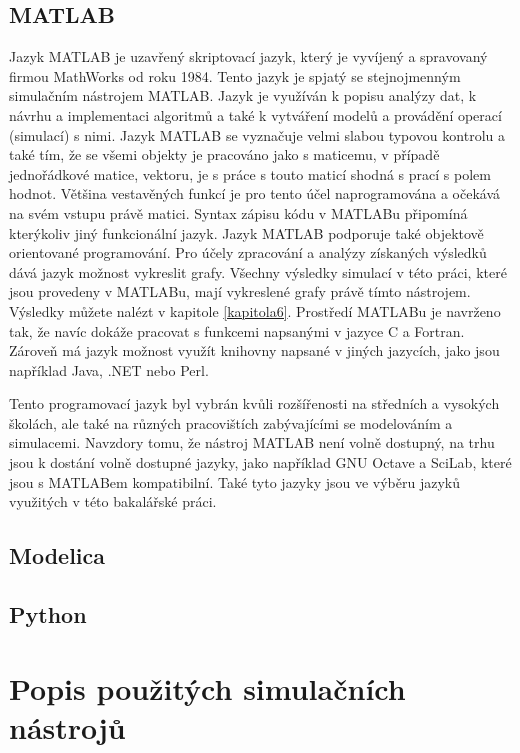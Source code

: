 \subsection{MATLAB}
Jazyk MATLAB je uzavřený skriptovací jazyk, který je vyvíjený a spravovaný firmou MathWorks od roku 1984. Tento jazyk je spjatý se stejnojmenným simulačním nástrojem MATLAB. Jazyk je využíván k popisu analýzy dat, k návrhu a implementaci algoritmů a také k vytváření modelů a provádění operací (simulací) s nimi. Jazyk MATLAB se vyznačuje velmi slabou typovou kontrolu a také tím, že se všemi objekty je pracováno jako s maticemu, v případě jednořádkové matice, vektoru, je s práce s touto maticí shodná s prací s polem hodnot. Většina vestavěných funkcí je pro tento účel naprogramována a očekává na svém vstupu právě matici. Syntax zápisu kódu v MATLABu připomíná kterýkoliv jiný funkcionální jazyk. Jazyk MATLAB podporuje také objektově orientované programování. Pro účely zpracování a analýzy získaných výsledků dává jazyk možnost vykreslit grafy. Všechny výsledky simulací v této práci, které jsou provedeny v MATLABu, mají vykreslené grafy právě tímto nástrojem. Výsledky můžete nalézt v kapitole \ref{kapitola6}. Prostředí MATLABu je navrženo tak, že navíc dokáže pracovat s funkcemi napsanými v jazyce C a Fortran. Zároveň má jazyk možnost využít knihovny napsané v jiných jazycích, jako jsou například Java, .NET nebo Perl.


Tento programovací jazyk byl vybrán kvůli rozšířenosti na středních a vysokých školách, ale také na různých pracovištích zabývajícími se modelováním a simulacemi. Navzdory tomu, že nástroj MATLAB není volně dostupný, na trhu jsou k dostání volně dostupné jazyky, jako například GNU Octave a SciLab, které jsou s MATLABem kompatibilní. Také tyto jazyky jsou ve výběru jazyků využitých v této bakalářské práci.


\subsection{Modelica}

\subsection{Python}

\section{Popis použitých simulačních nástrojů}

